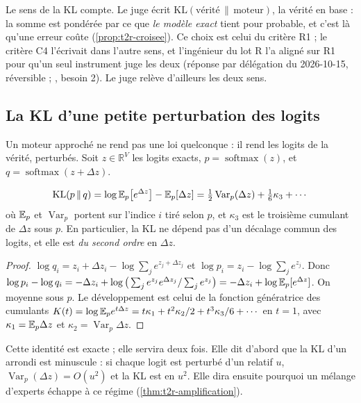 Le sens de la KL compte. Le juge écrit $\mathrm{KL}(\text{vérité}\,\|\,\text{moteur})$, la vérité en base : la somme est pondérée par ce que \emph{le modèle exact} tient pour probable, et c'est là qu'une erreur coûte (\cref{prop:t2r-croisee}). Ce choix est celui du critère R1 ; le critère C4 l'écrivait dans l'autre sens, et l'ingénieur du lot R l'a aligné sur R1 pour qu'un seul instrument juge les deux (réponse par délégation du 2026-10-15, réversible ; , besoin 2). Le juge relève d'ailleurs les deux sens.

\subsection{La KL d'une petite perturbation des logits}\label{sec:t2r-cumulants}

Un moteur approché ne rend pas une loi quelconque : il rend les logits de la vérité, perturbés. Soit $z \in \mathbb{R}^V$ les logits exacts, $p = \operatorname{softmax}(z)$, et $q = \operatorname{softmax}(z + \Delta z)$.

\begin{proposition}\label{prop:t2r-cumulants}
\begin{equation}\label{eq:t2r-cumulants}
\mathrm{KL}(p\,\|\,q) = \log \mathbb{E}_p\big[e^{\Delta z}\big] - \mathbb{E}_p[\Delta z] = \tfrac12\operatorname{Var}_p(\Delta z) + \tfrac16\kappa_3 + \cdots
\end{equation}
où $\mathbb{E}_p$ et $\operatorname{Var}_p$ portent sur l'indice $i$ tiré selon $p$, et $\kappa_3$ est le troisième cumulant de $\Delta z$ sous $p$. En particulier, la KL ne dépend pas d'un décalage commun des logits, et elle est \emph{du second ordre} en $\Delta z$.
\end{proposition}

\begin{proof}
$\log q_i = z_i + \Delta z_i - \log\sum_j e^{z_j + \Delta z_j}$ et $\log p_i = z_i - \log\sum_j e^{z_j}$. Donc $\log p_i - \log q_i = -\Delta z_i + \log\big(\sum_j e^{z_j}e^{\Delta z_j}/\sum_j e^{z_j}\big) = -\Delta z_i + \log \mathbb{E}_p[e^{\Delta z}]$. On moyenne sous $p$. Le développement est celui de la fonction génératrice des cumulants $K(t) = \log \mathbb{E}_p e^{t\Delta z} = t\kappa_1 + t^2\kappa_2/2 + t^3\kappa_3/6 + \cdots$ en $t = 1$, avec $\kappa_1 = \mathbb{E}_p\Delta z$ et $\kappa_2 = \operatorname{Var}_p \Delta z$.
\end{proof}

Cette identité est exacte ; elle servira deux fois. Elle dit d'abord que la KL d'un arrondi est minuscule : si chaque logit est perturbé d'un relatif $u$, $\operatorname{Var}_p(\Delta z) = O(u^2)$ et la KL est en $u^2$. Elle dira ensuite pourquoi un mélange d'experts échappe à ce régime (\cref{thm:t2r-amplification}).

